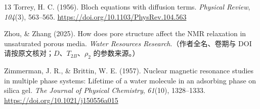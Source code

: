 \documentclass[11pt,a4paper]{article}
\newcommand{\TB}{T_{2B}}
\begin{document}
\begin{thebibliography}{13}
Torrey, H. C. (1956). Bloch equations with diffusion terms. \emph{Physical Review}, \emph{104}(3), 563--565.
\url{https://doi.org/10.1103/PhysRev.104.563}

Zhou, \& Zhang (2025). How does pore structure affect the NMR relaxation in unsaturated porous media.
\emph{Water Resources Research}.（作者全名、卷期与 DOI 请按原文核对；$D$、$\TB$、$\rho_2$ 的参数来源。）

Zimmerman, J. R., \& Brittin, W. E. (1957). Nuclear magnetic resonance studies in multiple phase systems: Lifetime of a water molecule
in an adsorbing phase on silica gel. \emph{The Journal of Physical Chemistry}, \emph{61}(10), 1328--1333. \url{https://doi.org/10.1021/j150556a015}
\end{thebibliography}
\end{document}
